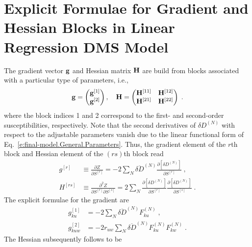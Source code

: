 \documentclass[aip,amsmath,amssymb,reprint,floatfix]{revtex4-1}
\begin{document}
\section{\label{a:blocks} Explicit Formulae for Gradient and Hessian Blocks in Linear Regression DMS Model}

The gradient vector ${\bf g}$ and Hessian matrix ${\bf H}$ 
are build from blocks associated with a particular type of parameters, i.e.,
%
\begin{equation}\label{e:Newton.gH}
 {\bf g} = 
\begin{pmatrix}
{\bf g}^{[1]} \\ 
{\bf g}^{[2]} 
\end{pmatrix} ,\quad
 {\bf H} = 
\begin{pmatrix}
{\bf H}^{[11]} & {\bf H}^{[12]}  \\ 
{\bf H}^{[21]} & {\bf H}^{[22]}  
\end{pmatrix} \;.
\end{equation}
%
where the block indices 1 and 2 correspond to the first\hyp{} and second\hyp{}order susceptibilities, respectively.
Note that the second derivatives of $\delta D^{(N)}$ 
with respect to the adjustable parameters vanish
due to the linear functional form of Eq.~\eqref{e:final-model.General.Parameters}.
Thus, the gradient element of the $r$th block and Hessian element of the $(rs)$th block read
%
\begin{subequations}
 \begin{align}
  g^{[r ]}    &\equiv \frac{\partial   Z}{\partial S^{[r]}} 
     =-2\sum_N \overline{\delta D}^{(N)}
               \frac{\partial   \left[ \delta D^{(N)} \right]}{\partial S^{[r]}} \;,\\
  H^{[rs]} &\equiv \frac{\partial^2 Z}{\partial S^{[r]} \partial S^{[s]}}  
     = 2\sum_N 
        \frac{\partial   \left[ \delta D^{(N)} \right]}{\partial S^{[r]}}
        \frac{\partial   \left[ \delta D^{(N)} \right]}{\partial S^{[s]}} \;.
 \end{align}
\end{subequations}
%
The explicit formulae for the gradient are
%
\begin{subequations}
 \begin{align}
  g^{[1]}_{ku} &=-2\sum_N \overline{\delta D}^{(N)} F^{(N)}_{ku} \;,\\
  g^{[2]}_{kuw} &=-2r_{uw} \sum_N \overline{\delta D}^{(N)} F^{(N)}_{ku} F^{(N)}_{kw} \;.
 \end{align}
\end{subequations}
%
The Hessian subsequently follows to be
\end{document}
